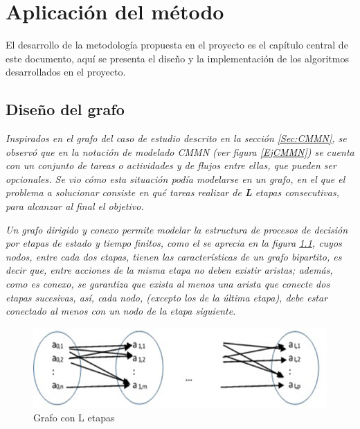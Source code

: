\chapter{Aplicación del método}
\label{Metodo}
El desarrollo de la metodología propuesta en el proyecto es el capítulo central de este documento, aquí se presenta el diseño y la implementación de los algoritmos desarrollados en el proyecto.





\section{Diseño del grafo}
\textit{Inspirados en el grafo del caso de estudio descrito en la sección \ref{Sec:CMMN}, se observó que en la notación de modelado CMMN (ver figura \ref{EjCMMN}) se cuenta con un conjunto de tareas o actividades y de flujos entre ellas, que pueden ser opcionales. Se vio cómo esta situación podía modelarse en un grafo, en el que el problema a solucionar consiste en qué tareas realizar de \textbf{L} etapas consecutivas, para alcanzar al final el objetivo.}

\textit{Un grafo dirigido y conexo permite modelar la estructura de procesos de decisión por etapas de estado y tiempo finitos, como el se aprecia en la figura \ref{GrafoEtapas}, cuyos nodos, entre cada dos etapas, tienen las características de un grafo bipartito, es decir que, entre acciones de la misma etapa no deben existir aristas; además, como es conexo, se garantiza que exista al menos una arista que conecte dos etapas sucesivas, así, cada nodo, (excepto los de la última etapa), debe estar conectado al menos con un nodo de la etapa siguiente. }

\begin{figure}[H]
  \centering
    \includegraphics[scale=0.8]{GrafoEtapas.png}
  \caption{Grafo con L etapas}
  \label{GrafoEtapas}
\end{figure}

